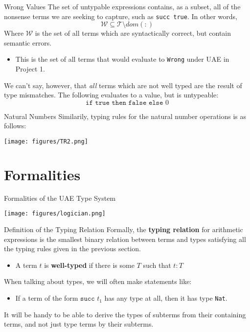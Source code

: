 \documentclass[11pt]{beamer}
\begin{document}
\begin{frame}[fragile=singleslide]{Wrong Values}
The set of untypable expressions contains, as a subset, all of the nonsense terms we are seeking to capture, such as \texttt{succ true}.  In other words, 
\begin{equation}
\mathcal{W} \subseteq \mathcal{T} \setminus dom(:)
\end{equation}
Where $\mathcal{W}$ is the set of all terms which are syntactically correct, but contain semantic errors.  
\begin{itemize}
\item This is the set of all terms that would evaluate to \texttt{Wrong} under UAE in Project 1.  
\end{itemize}
We can't say, however, that \emph{all} terms which are not well typed are the result of type mismatches.  The following evaluates to a value, but is untypeable:
\begin{equation}
\texttt{if true then false else } 0
\end{equation}
\end{frame}


\begin{frame}[fragile=singleslide]{Natural Numbers}
Similarily, typing rules for the natural number operations is as follows:
\begin{center}
\texttt{[image: figures/TR2.png]}
\end{center}
\end{frame}

\section[Formalities]{Formalities}
\begin{frame}[fragile=singleslide]{Formalities of the UAE Type System}
\begin{center}
\texttt{[image: figures/logician.png]}
\end{center}
\end{frame}


\begin{frame}[fragile=singleslide]{Definition of the Typing Relation}
Formally, the \textbf{typing relation} for arithmetic expressions is the smallest binary relation between terms and types satisfying all the typing rules given in the previous section.
\begin{itemize}
\item A term $t$ is \textbf{well-typed} if there is some $T$ such that $t : T$ 
\end{itemize}  
When talking about types, we will often make statements like:
\begin{itemize}
\item If a term of the form $\texttt{succ } t_1$ has any type at all, then it has type \texttt{Nat}.
\end{itemize}
It will be handy to be able to derive the types of subterms from their containing terms, and not just type terms by their subterms.  
\end{frame}
\end{document}
